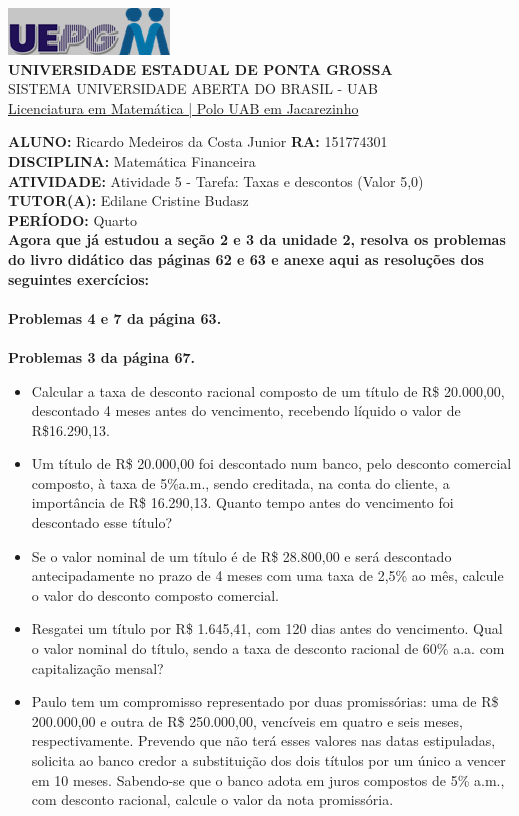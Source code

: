 \documentclass[a4paper, 12pt]{article}
\begin{document}
\begin{flushleft}\includegraphics{logo}\\
\textbf{UNIVERSIDADE ESTADUAL DE PONTA GROSSA} \\
SISTEMA UNIVERSIDADE ABERTA DO BRASIL - UAB \\
\underline{Licenciatura em Matemática | Polo UAB em Jacarezinho}\end{flushleft} 
\textbf{ALUNO:} Ricardo Medeiros da Costa Junior   \textbf{RA:} 151774301 \\
\textbf{DISCIPLINA:} Matemática Financeira \\
\textbf{ATIVIDADE:} Atividade 5 - Tarefa: Taxas e descontos (Valor 5,0) \\
\textbf{TUTOR(A):} Edilane Cristine Budasz \\
\textbf{PERÍODO:} Quarto \\

\textbf{Agora que já estudou a seção 2 e 3 da unidade 2, resolva os problemas do livro didático das páginas 62 e 63 e anexe aqui as resoluções dos seguintes exercícios:  \\\\
  Problemas 4 e 7 da página 63. \\\\
  Problemas 3 da página 67.}

\begin{itemize}

\item Calcular a taxa de desconto racional composto de um título de R\$ 20.000,00, descontado  4  meses  antes  do  vencimento,  recebendo  líquido  o  valor  de  R\$16.290,13.

\item Um  título  de  R\$  20.000,00  foi  descontado  num  banco,  pelo  desconto comercial composto, à taxa de 5\%a.m., sendo creditada, na conta do cliente, a importância  de  R\$  16.290,13.  Quanto  tempo  antes  do  vencimento  foi descontado esse título?

\item Se o valor nominal de um título é de R\$ 28.800,00 e será descontado antecipadamente no prazo de 4 meses com uma taxa de 2,5\% ao mês, calcule o valor do desconto composto comercial.

\item Resgatei um título por R\$ 1.645,41, com 120 dias antes do vencimento. Qual o valor nominal do título, sendo a taxa de desconto racional de 60\% a.a. com capitalização mensal?

\item Paulo tem um compromisso representado por duas promissórias: uma de R\$ 200.000,00 e outra de R\$ 250.000,00, vencíveis em quatro e seis meses, respectivamente. Prevendo que não terá esses valores nas datas estipuladas, solicita ao banco credor a substituição dos dois títulos por um único a vencer em  10  meses.  Sabendo-se  que  o  banco  adota  em  juros  compostos  de  5\% a.m.,  com  desconto  racional,  calcule  o  valor  da  nota  promissória.
  
\end{itemize}
\end{document}
